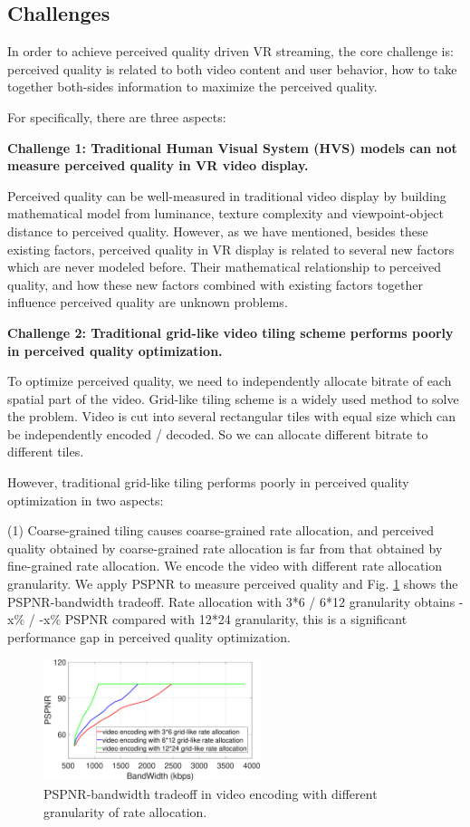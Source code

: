 \subsection{Challenges}
In order to achieve perceived quality driven VR streaming, the core challenge is: perceived quality is related to both video content and user behavior, how to take together both-sides information to maximize the perceived quality. 

For specifically, there are three aspects:

\textbf{Challenge 1: Traditional Human Visual System (HVS) models can not measure perceived quality in VR video display.} 

Perceived quality can be well-measured in traditional video display by building mathematical model from luminance, texture complexity and viewpoint-object distance to perceived quality. However, as we have mentioned, besides these existing factors, perceived quality in VR display is related to several new factors which are never modeled before. Their mathematical relationship to perceived quality, and how these new factors combined with existing factors together influence perceived quality are unknown problems.

\textbf{Challenge 2: Traditional grid-like video tiling scheme performs poorly in perceived quality optimization.} 

To optimize perceived quality, we need to independently allocate bitrate of each spatial part of the video. Grid-like tiling scheme is a widely used method to solve the problem. Video is cut into several rectangular tiles with equal size which can be independently encoded / decoded. So we can allocate different bitrate to different tiles.

However, traditional grid-like tiling performs poorly in perceived quality optimization in two aspects: 

(1) Coarse-grained tiling causes coarse-grained rate allocation, and perceived quality obtained by coarse-grained rate allocation is far from that obtained by fine-grained rate allocation. We encode the video with different rate allocation granularity. We apply PSPNR to measure perceived quality and Fig. \ref{optimalencoding} shows the PSPNR-bandwidth tradeoff. Rate allocation with 3*6 / 6*12 granularity obtains -x\% / -x\% PSPNR compared with 12*24 granularity, this is a significant performance gap in perceived quality optimization.

\begin{figure}
  \centering
  \includegraphics[width=2.5in]{images/optimalencoding.eps}
  \caption{PSPNR-bandwidth tradeoff in video encoding with different granularity of rate allocation.}
  \label{optimalencoding}
  \end{figure}

